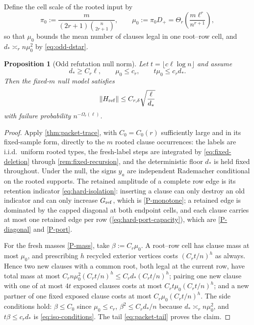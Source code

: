 \documentclass[11pt]{article}
\newtheorem{proposition}[proposition]{Proposition}
\theoremstyle{definition}
\theoremstyle{remark}
\newcommand{\1}{\mathbf 1}
\numberwithin{equation}{section}
\begin{document}
Define the cell scale of the rooted input by
\begin{equation}\label{eq:odd-mu}
 \pi_0:=\frac m{(2r+1)\binom n{2r+1}},
 \qquad
 \mu_0:=\pi_0D_+
 =\Theta_r\!\left(\frac{m\ell^r}{n^{r+1}}\right),
\end{equation}
so that $\mu_0$ bounds the mean number of clauses legal in one
root--row cell, and $d_*\asymp_rn\mu_0^2$ by \cref{eq:odd-dstar}.

\begin{proposition}[Odd refutation null norm]\label{prop:iso-null}
Let $t=\lfloor c\ell\log n\rfloor$ and assume
\begin{equation}\label{eq:iso-conditions}
 d_*\ge C_r\ell,
 \qquad
 \mu_0\le c_r,
 \qquad
 t\mu_0\le c_rd_*.
\end{equation}
Then the fixed-$m$ null model satisfies
\begin{equation}\label{eq:iso-null}
 \|H_{\rm ref}\|\le C_{r,\delta}\sqrt{\frac\ell{d_*}}
\end{equation}
with failure probability $n^{-\Omega_r(\ell)}$.
\end{proposition}
\begin{proof}
Apply \cref{thm:packet-trace}, with $C_0=C_0(r)$ sufficiently large and
in its fixed-sample form,
directly to the $m$ rooted clause occurrences: the labels are i.i.d.\
uniform rooted types, the fresh-label steps are integrated by
\cref{eq:fixed-deletion} through \cref{rem:fixed-recursion}, and the
deterministic floor $d_*$ is held fixed throughout.  Under the null,
the signs $y_a$ are independent Rademacher conditional on the rooted
supports.  The retained amplitude of a complete row edge is its
retention indicator \cref{eq:hard-isolation}: inserting a clause can
only destroy an old indicator and can only increase $G_{\rm ref}$,
which is \ref{P-monotone}; a retained edge is dominated by the capped
diagonal at both endpoint cells, and each clause carries at most one
retained edge per row (\cref{eq:hard-port-capacity}), which are
\ref{P-diagonal} and \ref{P-port}.

For the fresh masses \ref{P-mass}, take $\beta:=C_r\mu_0$.  A root--row
cell has clause mass at most $\mu_0$, and prescribing $h$ recycled
exterior vertices costs $(C_rt/n)^h$ as always.  Hence two new clauses
with a common root, both legal at the current row, have total mass at
most $C_rn\mu_0^2(C_rt/n)^h\le C_rd_*(C_rt/n)^h$; pairing one new
clause with one of at most $4t$ exposed clauses costs at most
$C_rt\mu_0(C_rt/n)^h$; and a new partner of one fixed exposed clause
costs at most $C_r\mu_0(C_rt/n)^h$.  The side conditions hold:
$\beta\le C_0$ since $\mu_0\le c_r$,
$\beta^2\le C_rd_*/n$ because $d_*\asymp_rn\mu_0^2$, and
$t\beta\le c_rd_*$ is \cref{eq:iso-conditions}.  The tail
\cref{eq:packet-tail} proves the claim.
\end{proof}
\end{document}
